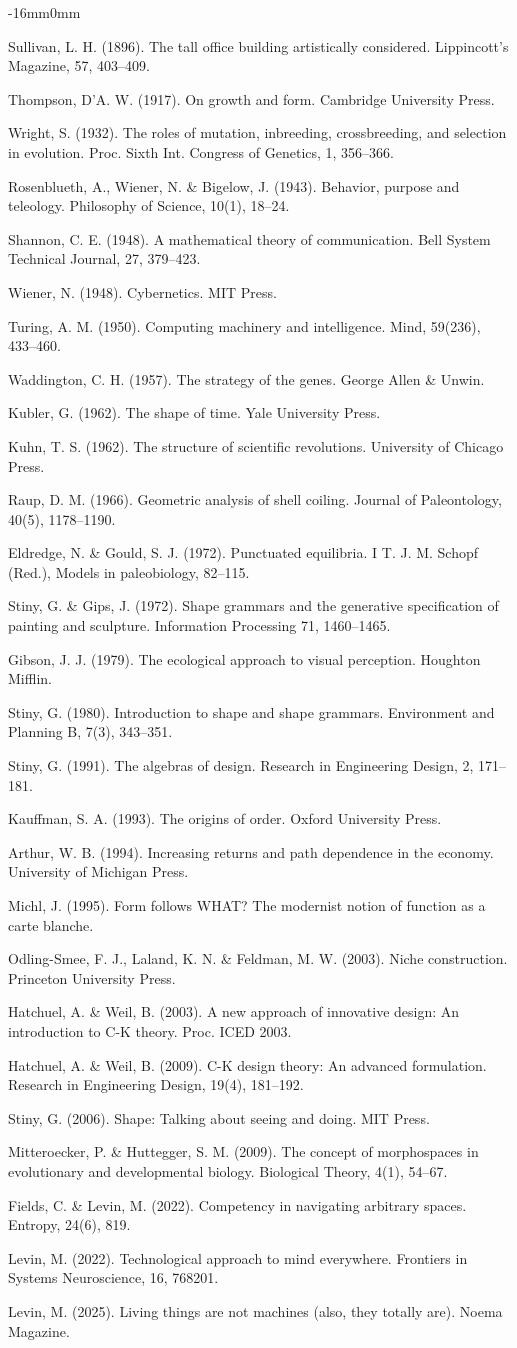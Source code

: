 \documentclass[10pt,oneside]{book}
\newcommand{\refentry}[1]{%
  \par\addvspace{0pt}%
  \begingroup\footnotesize\linespread{0.92}\selectfont
  \noindent\hangindent=4mm\hangafter=1 #1\par%
  \endgroup
}
\newenvironment{widebody}{%
  \begin{adjustwidth}{-16mm}{0mm}%
}{%
  \end{adjustwidth}%
}
\begin{document}
\begin{widebody}
\refentry{Sullivan, L. H. (1896). The tall office building artistically considered. Lippincott's Magazine, 57, 403–409.}
\refentry{Thompson, D'A. W. (1917). On growth and form. Cambridge University Press.}
\refentry{Wright, S. (1932). The roles of mutation, inbreeding, crossbreeding, and selection in evolution. Proc. Sixth Int. Congress of Genetics, 1, 356–366.}
\refentry{Rosenblueth, A., Wiener, N. \& Bigelow, J. (1943). Behavior, purpose and teleology. Philosophy of Science, 10(1), 18–24.}
\refentry{Shannon, C. E. (1948). A mathematical theory of communication. Bell System Technical Journal, 27, 379–423.}
\refentry{Wiener, N. (1948). Cybernetics. MIT Press.}
\refentry{Turing, A. M. (1950). Computing machinery and intelligence. Mind, 59(236), 433–460.}
\refentry{Waddington, C. H. (1957). The strategy of the genes. George Allen \& Unwin.}
\refentry{Kubler, G. (1962). The shape of time. Yale University Press.}
\refentry{Kuhn, T. S. (1962). The structure of scientific revolutions. University of Chicago Press.}
\refentry{Raup, D. M. (1966). Geometric analysis of shell coiling. Journal of Paleontology, 40(5), 1178–1190.}
\refentry{Eldredge, N. \& Gould, S. J. (1972). Punctuated equilibria. I T. J. M. Schopf (Red.), Models in paleobiology, 82–115.}
\refentry{Stiny, G. \& Gips, J. (1972). Shape grammars and the generative specification of painting and sculpture. Information Processing 71, 1460–1465.}
\refentry{Gibson, J. J. (1979). The ecological approach to visual perception. Houghton Mifflin.}
\refentry{Stiny, G. (1980). Introduction to shape and shape grammars. Environment and Planning B, 7(3), 343–351.}
\refentry{Stiny, G. (1991). The algebras of design. Research in Engineering Design, 2, 171–181.}
\refentry{Kauffman, S. A. (1993). The origins of order. Oxford University Press.}
\refentry{Arthur, W. B. (1994). Increasing returns and path dependence in the economy. University of Michigan Press.}
\refentry{Michl, J. (1995). Form follows WHAT? The modernist notion of function as a carte blanche.}
\refentry{Odling-Smee, F. J., Laland, K. N. \& Feldman, M. W. (2003). Niche construction. Princeton University Press.}
\refentry{Hatchuel, A. \& Weil, B. (2003). A new approach of innovative design: An introduction to C-K theory. Proc. ICED 2003.}
\refentry{Hatchuel, A. \& Weil, B. (2009). C-K design theory: An advanced formulation. Research in Engineering Design, 19(4), 181–192.}
\refentry{Stiny, G. (2006). Shape: Talking about seeing and doing. MIT Press.}
\refentry{Mitteroecker, P. \& Huttegger, S. M. (2009). The concept of morphospaces in evolutionary and developmental biology. Biological Theory, 4(1), 54–67.}
\refentry{Fields, C. \& Levin, M. (2022). Competency in navigating arbitrary spaces. Entropy, 24(6), 819.}
\refentry{Levin, M. (2022). Technological approach to mind everywhere. Frontiers in Systems Neuroscience, 16, 768201.}
\refentry{Levin, M. (2025). Living things are not machines (also, they totally are). Noema Magazine.}
\end{widebody}
\end{document}

